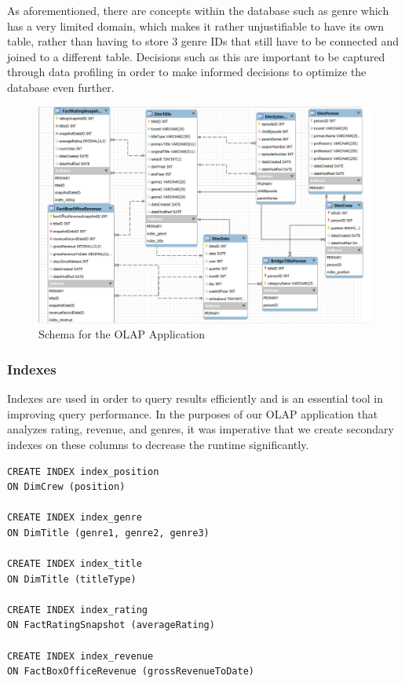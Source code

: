 As aforementioned, there are concepts within the database such as genre which has a very limited domain, which makes it rather unjustifiable to have its own table, rather than having to store 3 genre IDs that still have to be connected and joined to a different table. Decisions such as this are important to be captured through data profiling in order to make informed decisions to optimize the database even further. \\

\begin{figure}[H]
    \centering
    \includegraphics[width=0.8\linewidth]{images/schema.png}
    \caption{Schema for the OLAP Application}
    \label{fig:your_label}
\end{figure}

\subsubsection{Indexes}

Indexes are used in order to query results efficiently and is an essential tool in improving query performance. In the purposes of our OLAP application that analyzes rating, revenue, and genres, it was imperative that we create secondary indexes on these columns to decrease the runtime significantly. 

\begin{lstlisting}
CREATE INDEX index_position
ON DimCrew (position)

CREATE INDEX index_genre
ON DimTitle (genre1, genre2, genre3)

CREATE INDEX index_title
ON DimTitle (titleType)

CREATE INDEX index_rating
ON FactRatingSnapshot (averageRating)

CREATE INDEX index_revenue
ON FactBoxOfficeRevenue (grossRevenueToDate)
\end{lstlisting}

